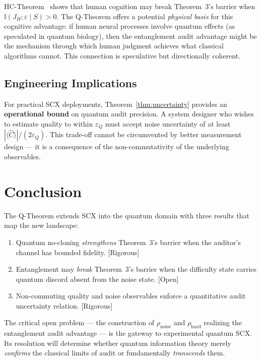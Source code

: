 \documentclass[12pt,a4paper]{article}
\newcommand{\rigorous}{\textcolor{green!50!black}{\small\textsf{[Rigorous]}}}
\newcommand{\openquest}{\textcolor{red!70!black}{\small\textsf{[Open]}}}
\newcommand{\I}{\mathbb{I}}
\begin{document}
HC-Theorem~\citep{scx2024hc} shows that human cognition may break Theorem~3's
barrier when $\I(J_H;\varepsilon\mid S)>0$.  The Q-Theorem offers a potential
\emph{physical basis} for this cognitive advantage: if human neural processes
involve quantum effects (as speculated in quantum biology), then the
entanglement audit advantage might be the mechanism through which human
judgment achieves what classical algorithms cannot.  This connection is
speculative but directionally coherent.

\subsection{Engineering Implications}

For practical SCX deployments, Theorem~\ref{thm:uncertainty} provides an
\textbf{operational bound} on quantum audit precision.  A system designer who
wishes to estimate quality to within $\varepsilon_Q$ must accept noise
uncertainty of at least $|\langle\hat{C}\rangle|/(2\varepsilon_Q)$.  This
trade-off cannot be circumvented by better measurement design — it is a
consequence of the non-commutativity of the underlying observables.

\section{Conclusion}

The Q-Theorem extends SCX into the quantum domain with three results that map
the new landscape:
\begin{enumerate}[label=(\arabic*)]
    \item Quantum no-cloning \emph{strengthens} Theorem~3's barrier when the
          auditor's channel has bounded fidelity.  \rigorous
    \item Entanglement may \emph{break} Theorem~3's barrier when the difficulty
          state carries quantum discord absent from the noise state.  \openquest
    \item Non-commuting quality and noise observables enforce a quantitative
          audit uncertainty relation.  \rigorous
\end{enumerate}

The critical open problem — the construction of $\rho_{\mathrm{noise}}$ and
$\rho_{\mathrm{hard}}$ realizing the entanglement audit advantage — is the
gateway to experimental quantum SCX.  Its resolution will determine whether
quantum information theory merely \emph{confirms} the classical limits of audit
or fundamentally \emph{transcends} them.
\end{document}
